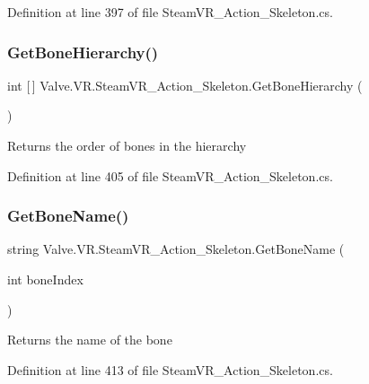 Definition at line 397 of file Steam\+V\+R\+\_\+\+Action\+\_\+\+Skeleton.\+cs.

\mbox{\label{class_valve_1_1_v_r_1_1_steam_v_r___action___skeleton_ae0ccc65c036c7bf1685362aa92392c5b}} 
\subsubsection{\texorpdfstring{GetBoneHierarchy()}{GetBoneHierarchy()}}
{\footnotesize\ttfamily int \mbox{[}$\,$\mbox{]} Valve.\+V\+R.\+Steam\+V\+R\+\_\+\+Action\+\_\+\+Skeleton.\+Get\+Bone\+Hierarchy (\begin{DoxyParamCaption}{ }\end{DoxyParamCaption})}



Returns the order of bones in the hierarchy 



Definition at line 405 of file Steam\+V\+R\+\_\+\+Action\+\_\+\+Skeleton.\+cs.

\mbox{\label{class_valve_1_1_v_r_1_1_steam_v_r___action___skeleton_a7d77b9fd5ed9b996ebdca5ba40a811a7}} 
\subsubsection{\texorpdfstring{GetBoneName()}{GetBoneName()}}
{\footnotesize\ttfamily string Valve.\+V\+R.\+Steam\+V\+R\+\_\+\+Action\+\_\+\+Skeleton.\+Get\+Bone\+Name (\begin{DoxyParamCaption}\item[{int}]{bone\+Index }\end{DoxyParamCaption})}



Returns the name of the bone 



Definition at line 413 of file Steam\+V\+R\+\_\+\+Action\+\_\+\+Skeleton.\+cs.

